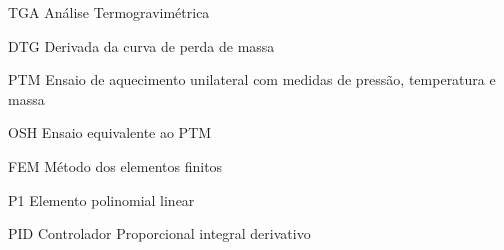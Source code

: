 \documentclass[
	12pt,				%
	openright,			%
	twoside,			%
	a4paper,			%
	chapter=TITLE,		%
	english,			%
	french,				%
	spanish,			%
	brazil,				%
	hyphens,
  oldfontcommands]{abntex2}
\theoremstyle{definition}
\theoremstyle{definition}
\begin{document}
 

\listoffigures*
\cleardoublepage

\listoftables*
\cleardoublepage

\begin{siglas}
  \item[TGA] Análise Termogravimétrica
  \item[DTG] Derivada da curva de perda de massa
  \item[PTM] Ensaio de aquecimento unilateral com medidas de pressão,
    temperatura e massa
  \item[OSH] Ensaio equivalente ao PTM
  \item[FEM] Método dos elementos finitos
  \item[P1]  Elemento polinomial linear
  \item[PID] Controlador Proporcional integral derivativo
\end{siglas}
\end{document}
